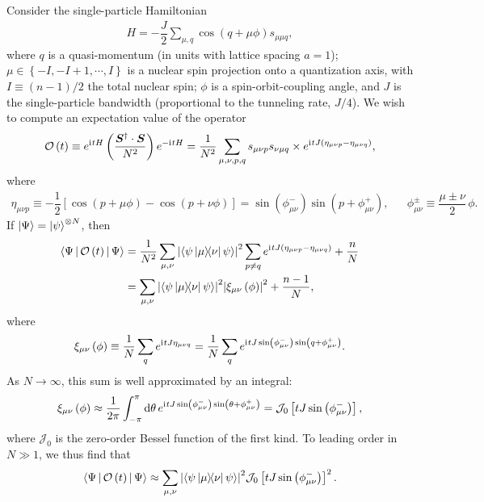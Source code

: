 \documentclass[nofootinbib,notitlepage,11pt]{revtex4-2}
\newcommand{\f}[2]{\dfrac{#1}{#2}} %
\newcommand{\p}[1]{\left(#1\right)} %
\renewcommand{\sp}[1]{\left[#1\right]} %
\renewcommand{\set}[1]{\left\{#1\right\}} %
\newcommand{\bk}{\Braket} %
\renewcommand{\v}{\bm} %
\renewcommand{\c}{\cdot} %
\renewcommand{\dd}{\text{d}} %
\renewcommand{\i}{\mathrm{i}\mkern1mu} %
\newcommand{\1}{\mathds{1}}
\newcommand{\J}{\mathcal{J}}
\renewcommand{\O}{\mathcal{O}}
\begin{document}
Consider the single-particle Hamiltonian
\begin{align}
  H = -\f{J}{2} \sum_{\mu,q} \cos\p{q + \mu\phi} s_{\mu\mu q},
\end{align}
where $q$ is a quasi-momentum (in units with lattice spacing $a=1$);
$\mu\in\set{-I,-I+1,\cdots,I}$ is a nuclear spin projection onto a
quantization axis, with $I\equiv\p{n-1}/2$ the total nuclear spin;
$\phi$ is a spin-orbit-coupling angle, and $J$ is the single-particle
bandwidth (proportional to the tunneling rate, $J/4$).  We wish to
compute an expectation value of the operator
\begin{align}
  \O\p{t}
  \equiv e^{\i t H} \p{\f{\v S^\dag \c\v S}{N^2}} e^{-\i t H}
  = \f1{N^2} \sum_{\mu,\nu,p,q} s_{\mu\nu p} s_{\nu\mu q} \times
  e^{\i tJ\p{\eta_{\mu\nu p}-\eta_{\mu\nu q}}},
\end{align}
where
\begin{align}
  \eta_{\mu\nu p}
  \equiv -\f12 \sp{\cos\p{p+\mu\phi} - \cos\p{p+\nu\phi}}
  = \sin\p{\phi_{\mu\nu}^-} \sin\p{p+\phi_{\mu\nu}^+},
  &&
  \phi_{\mu\nu}^\pm \equiv \f{\mu\pm\nu}{2}\,\phi.
\end{align}
If $\ket\Psi=\ket\psi^{\otimes N}$, then
\begin{align}
  \bk{\Psi|\O\p{t}|\Psi}
  &= \f1{N^2} \sum_{\mu,\nu} \abs{\bk{\psi\op{\mu}{\nu}\psi}}^2
  \sum_{p\ne q} e^{\i tJ\p{\eta_{\mu\nu p}-\eta_{\mu\nu q}}} + \f{n}{N} \\
  &= \sum_{\mu,\nu} \abs{\bk{\psi\op{\mu}{\nu}\psi}}^2
  \abs{\xi_{\mu\nu}\p{\phi}}^2 + \f{n-1}{N},
\end{align}
where
\begin{align}
  \xi_{\mu\nu}\p{\phi} \equiv \f1N \sum_q e^{\i tJ\eta_{\mu\nu q}}
  = \f1N \sum_q e^{\i tJ\sin\p{\phi_{\mu\nu}^-} \sin\p{q+\phi_{\mu\nu}^+}}.
\end{align}
As $N\to\infty$, this sum is well approximated by an integral:
\begin{align}
  \xi_{\mu\nu}\p{\phi} \approx \f1{2\pi} \int_{-\pi}^\pi \dd\theta\,
  e^{\i tJ\sin\p{\phi_{\mu\nu}^-} \sin\p{\theta+\phi_{\mu\nu}^+}}
  = \J_0\sp{tJ\sin\p{\phi_{\mu\nu}^-}},
\end{align}
where $\J_0$ is the zero-order Bessel function of the first kind.  To
leading order in $N\gg1$, we thus find that
\begin{align}
  \bk{\Psi|\O\p{t}|\Psi}
  \approx \sum_{\mu,\nu} \abs{\bk{\psi\op{\mu}{\nu}\psi}}^2
  \J_0\sp{tJ\sin\p{\phi_{\mu\nu}^-}}^2.
  \label{eq:O_time}
\end{align}
\end{document}
